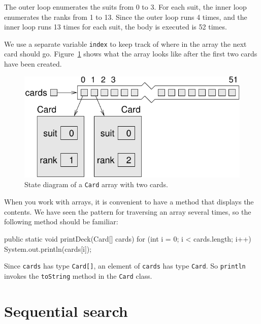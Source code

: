 \documentclass[12pt]{book}
\theoremstyle{exercise}
\newcommand{\java}[1]{\verb"#1"}
\begin{document}
The outer loop enumerates the suits from 0 to 3.
For each suit, the inner loop enumerates the ranks from 1 to 13.
Since the outer loop runs 4 times, and the inner loop runs 13 times for each suit, the body is executed is 52 times.


We use a separate variable \java{index} to keep track of where in the array the next card should go.
Figure~\ref{fig.cardarray2} shows what the array looks like after the first two cards have been created.

\begin{figure}
\begin{center}
\includegraphics{figs/cardarray2.pdf}
\caption{State diagram of a \java{Card} array with two cards.}
\label{fig.cardarray2}
\end{center}
\end{figure}


When you work with arrays, it is convenient to have a method that displays the contents.
We have seen the pattern for traversing an array several times, so the following method should be familiar:

\begin{code}
    public static void printDeck(Card[] cards) {
        for (int i = 0; i < cards.length; i++) {
            System.out.println(cards[i]);
        }
    }
\end{code}

Since \java{cards} has type \java{Card[]}, an element of \java{cards} has type \java{Card}.
So \java{println} invokes the \java{toString} method in the \java{Card} class.


\section{Sequential search}
\label{findcard}
\end{document}
